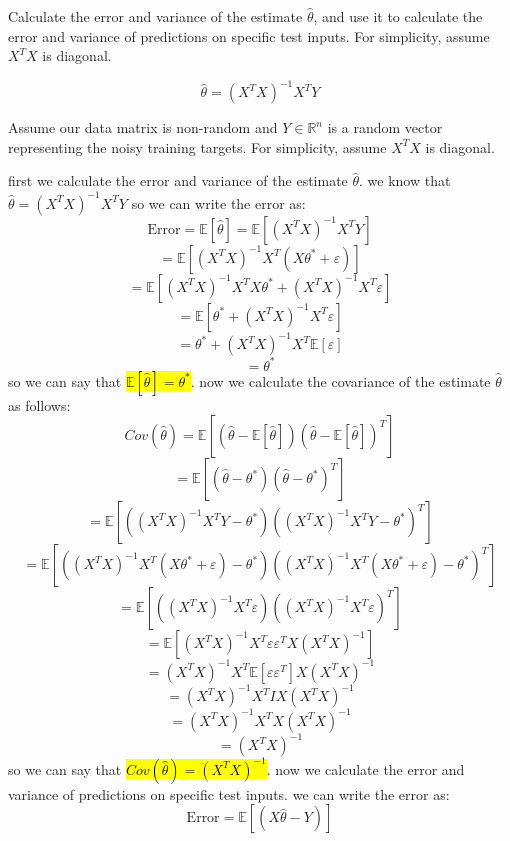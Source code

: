 Calculate the error and variance of the estimate \( \hat{\theta} \), and use it to calculate the error and variance of predictions on specific test inputs. For simplicity, assume \( X^T X \) is diagonal.

\[
\hat{\theta} = (X^T X)^{-1} X^T Y
\]

Assume our data matrix is non-random and \( Y \in \mathbb{R}^n \) is a random vector representing the noisy training targets. For simplicity, assume \( X^T X \) is diagonal.
\begin{qsolve}
	\begin{qsolve}[]
		first we calculate the error and variance of the estimate $\hat{\theta}$. we know that $\hat{\theta} = (X^T X)^{-1} X^T Y$ so we can write the error as:
		$$
		\text{Error} = \mathbb{E}\left[ \hat{\theta} \right] = \mathbb{E}\left[ (X^T X)^{-1} X^T Y \right]
		$$
		$$
		= \mathbb{E} \left[ (X^T X)^{-1} X^T (X\theta^* + \varepsilon) \right]
		$$
		$$
		= \mathbb{E} \left[ (X^T X)^{-1} X^T X\theta^* + (X^T X)^{-1} X^T \varepsilon \right]
		$$
		$$
		= \mathbb{E} \left[ \theta^* + (X^T X)^{-1} X^T \varepsilon \right]
		$$
		$$
		= \theta^* + (X^T X)^{-1} X^T \mathbb{E} \left[ \varepsilon \right]
		$$
		$$
		= \theta^*
		$$
		so we can say that \hl{$\mathbb{E}\left[ \hat{\theta} \right] = \theta^*$}. now we calculate the covariance of the estimate $\hat{\theta}$ as follows:
		$$
		Cov(\hat{\theta}) = \mathbb{E}\left[ (\hat{\theta} - \mathbb{E}\left[ \hat{\theta} \right])(\hat{\theta} - \mathbb{E}\left[ \hat{\theta} \right])^T \right]
		$$
		$$
		= \mathbb{E}\left[ (\hat{\theta} - \theta^*)(\hat{\theta} - \theta^*)^T \right]
		$$
		$$
		= \mathbb{E}\left[ ((X^T X)^{-1} X^T Y - \theta^*)((X^T X)^{-1} X^T Y - \theta^*)^T \right]
		$$
		$$
		= \mathbb{E}\left[ ((X^T X)^{-1} X^T (X\theta^* + \varepsilon) - \theta^*)((X^T X)^{-1} X^T (X\theta^* + \varepsilon) - \theta^*)^T \right]
		$$
		$$
		= \mathbb{E}\left[ ((X^T X)^{-1} X^T \varepsilon)((X^T X)^{-1} X^T \varepsilon)^T \right]
		$$
		$$
		= \mathbb{E}\left[ (X^T X)^{-1} X^T \varepsilon \varepsilon^T X (X^T X)^{-1} \right]
		$$
		$$
		= (X^T X)^{-1} X^T \mathbb{E}\left[ \varepsilon \varepsilon^T \right] X (X^T X)^{-1}
		$$
		$$
		= (X^T X)^{-1} X^T I X (X^T X)^{-1}
		$$
		$$
		=  (X^T X)^{-1} X^T X (X^T X)^{-1}
		$$
		$$
		=  (X^T X)^{-1}
		$$
		\splitqsolve[\splitqsolve]
		so we can say that \hl{$Cov(\hat{\theta}) =  (X^T X)^{-1}$}. now we calculate the error and variance of predictions on specific test inputs. we can write the error as:
		$$
		\text{Error} = \mathbb{E}\left[ (X\hat{\theta} - Y )\right]
		$$

\end{qsolve}
\end{qsolve}
